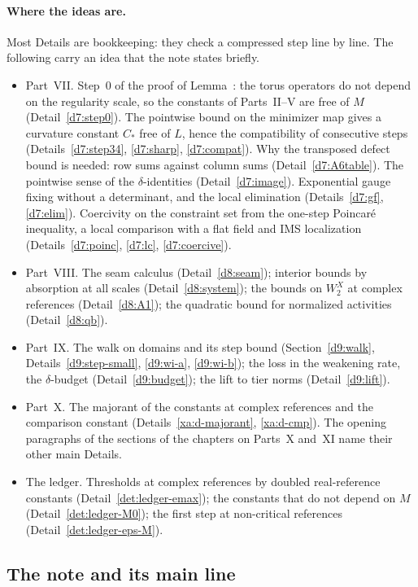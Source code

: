 \paragraph{Where the ideas are.} Most Details are bookkeeping: they check a compressed step line by line. The following carry an idea that the note states briefly.
\begin{itemize}
\item Part~VII. Step~0 of the proof of Lemma~: the torus operators do not depend on the regularity scale, so the constants of Parts~II--V are free of $M$ (Detail~\ref{d7:step0}). The pointwise bound on the minimizer map gives a curvature constant $C_*$ free of $L$, hence the compatibility of consecutive steps (Details~\ref{d7:step34}, \ref{d7:sharp}, \ref{d7:compat}). Why the transposed defect bound is needed: row sums against column sums (Detail~\ref{d7:A6table}). The pointwise sense of the $\delta$-identities (Detail~\ref{d7:image}). Exponential gauge fixing without a determinant, and the local elimination (Details~\ref{d7:gf}, \ref{d7:elim}). Coercivity on the constraint set from the one-step Poincar\'e inequality, a local comparison with a flat field and IMS localization (Details~\ref{d7:poinc}, \ref{d7:lc}, \ref{d7:coercive}).
\item Part~VIII. The seam calculus (Detail~\ref{d8:seam}); interior bounds by absorption at all scales (Detail~\ref{d8:system}); the bounds on $W_2^X$ at complex references (Detail~\ref{d8:A1}); the quadratic bound for normalized activities (Detail~\ref{d8:qb}).
\item Part~IX. The walk on domains and its step bound (Section~\ref{d9:walk}, Details~\ref{d9:step-small}, \ref{d9:wi-a}, \ref{d9:wi-b}); the loss in the weakening rate, the $\delta$-budget (Detail~\ref{d9:budget}); the lift to tier norms (Detail~\ref{d9:lift}).
\item Part~X. The majorant of the constants at complex references and the comparison constant (Details~\ref{xa:d-majorant}, \ref{xa:d-cmp}). The opening paragraphs of the sections of the chapters on Parts~X and~XI name their other main Details.
\item The ledger. Thresholds at complex references by doubled real-reference constants (Detail~\ref{det:ledger-emax}); the constants that do not depend on $M$ (Detail~\ref{det:ledger-M0}); the first step at non-critical references (Detail~\ref{det:ledger-eps-M}).
\end{itemize}

\subsection{The note and its main line}\label{subsec:guide-mainline}

